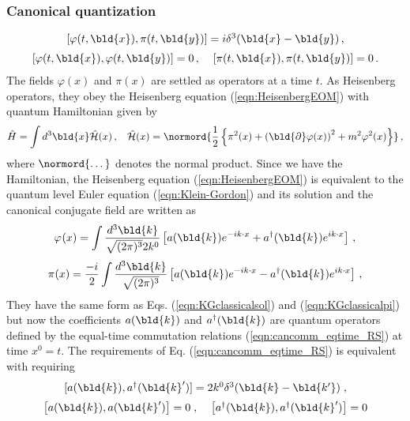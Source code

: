 \subsubsection{Canonical quantization}
\begin{equation}
\begin{array}{c}
[ \varphi(t,\bld{x}), \pi(t, \bld{y})] = i \delta^3 (\bld{x} - \bld{y} )\,,
\vspace{2mm}
\\
\left[ \varphi(t,\bld{x}), \varphi(t,\bld{y}) \right] = 0\,,
\;\;\;\;\left[ \pi(t,\bld{x}), \pi(t,\bld{y}) \right] = 0\,.
\end{array}
\label{eqn:cancomm_eqtime_RS}
\end{equation}
The fields $\varphi(x)$ and $\pi(x)$ are settled as operators at a time $t$.
As Heisenberg operators,
they obey the Heisenberg equation (\ref{eqn:HeisenbergEOM}) with quantum Hamiltonian
given by
\begin{equation}
\hat{H} = \int d^3 \bld{x} \hat{{\cal H}}(x)\,,
\hspace{3mm}
\hat{{\cal H}}(x) = 
\normord{ \frac{1}{2} \left\{
\pi^2 (x) + \left( \bld{\partial} \varphi(x) \right)^2 + m^2 \varphi^2(x)
\right\}
}\,,
\label{eqn:KG_Hamiltonian}
\end{equation}
where $\normord{\dots}$ denotes the normal product.
Since we have the Hamiltonian,
the Heisenberg equation (\ref{eqn:HeisenbergEOM}) is equivalent to the
quantum level Euler equation (\ref{eqn:Klein-Gordon}) and its solution 
and the canonical conjugate field are written as
\begin{equation}
\varphi_{}(x) = \int \frac{d^3 \bld{k}}{\sqrt{(2\pi)^3}2k^0} \left[
a(\bld{k}) e^{-i k \cdot x} + a^\dagger(\bld{k})e^{i k \cdot x} \right]\,,
\label{eqn:RS_fieldexpansion}
\end{equation}
\begin{equation}
\pi_{}(x) 
=
\frac{-i}{2}
\int \frac{d^3 \bld{k}}{\sqrt{(2\pi)^3}}  \left[
a(\bld{k}) e^{-i k \cdot x} - a^\dagger(\bld{k})e^{i k \cdot x} \right]\,,
\label{eqn:RS_pifieldexpansion}
\end{equation}
They have the same form as Eqs. (\ref{eqn:KGclassicalsol}) and (\ref{eqn:KGclassicalpi})
but now the coefficients $a(\bld{k})$ and $a^\dagger(\bld{k})$ are
quantum operators defined by the equal-time commutation relations (\ref{eqn:cancomm_eqtime_RS})
at time $x^0 = t$.
The requirements of Eq. (\ref{eqn:cancomm_eqtime_RS}) is equivalent with
requiring
\begin{equation}
\begin{array}{c}
[ a(\bld{k}), a^\dagger(\bld{k}')] = 2k^0 \delta^3 (\bld{k} - \bld{k'} )\;,
\vspace{2mm}
\\
\left[ a(\bld{k}), a(\bld{k}') \right] = 0\;,\;\;\;\;\left[ a^\dagger(\bld{k}), a^\dagger(\bld{k}') \right] = 0
\end{array}
\label{eqn:cancomm_RS}
\end{equation}

